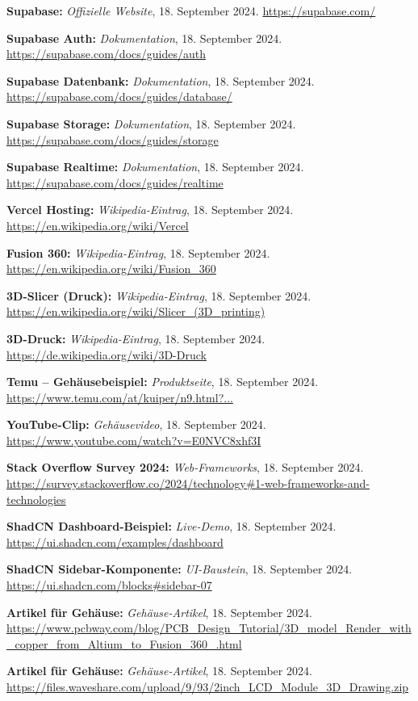 \begin{thebibliography}{9999}
\textbf{Supabase:} \textit{Offizielle Website}, 18. September 2024.  
\url{https://supabase.com/}

\textbf{Supabase Auth:} \textit{Dokumentation}, 18. September 2024.  
\url{https://supabase.com/docs/guides/auth}

\textbf{Supabase Datenbank:} \textit{Dokumentation}, 18. September 2024.  
\url{https://supabase.com/docs/guides/database/}

\textbf{Supabase Storage:} \textit{Dokumentation}, 18. September 2024.  
\url{https://supabase.com/docs/guides/storage}

\textbf{Supabase Realtime:} \textit{Dokumentation}, 18. September 2024.  
\url{https://supabase.com/docs/guides/realtime}

\textbf{Vercel Hosting:} \textit{Wikipedia-Eintrag}, 18. September 2024.  
\url{https://en.wikipedia.org/wiki/Vercel}

\textbf{Fusion 360:} \textit{Wikipedia-Eintrag}, 18. September 2024.  
\url{https://en.wikipedia.org/wiki/Fusion_360}

\textbf{3D-Slicer (Druck):} \textit{Wikipedia-Eintrag}, 18. September 2024.  
\url{https://en.wikipedia.org/wiki/Slicer_(3D_printing)}

\textbf{3D-Druck:} \textit{Wikipedia-Eintrag}, 18. September 2024.  
\url{https://de.wikipedia.org/wiki/3D-Druck}

\textbf{Temu – Gehäusebeispiel:} \textit{Produktseite}, 18. September 2024.  
\url{https://www.temu.com/at/kuiper/n9.html?...}

\textbf{YouTube-Clip:} \textit{Gehäusevideo}, 18. September 2024.  
\url{https://www.youtube.com/watch?v=E0NVC8xhf3I}

\textbf{Stack Overflow Survey 2024:} \textit{Web-Frameworks}, 18. September 2024.  
\url{https://survey.stackoverflow.co/2024/technology#1-web-frameworks-and-technologies}

\textbf{ShadCN Dashboard-Beispiel:} \textit{Live-Demo}, 18. September 2024.  
\url{https://ui.shadcn.com/examples/dashboard}

\textbf{ShadCN Sidebar-Komponente:} \textit{UI-Baustein}, 18. September 2024.  
\url{https://ui.shadcn.com/blocks#sidebar-07}

\textbf{Artikel für Gehäuse:} \textit{Gehäuse-Artikel}, 18. September 2024.  
\url{https://www.pcbway.com/blog/PCB_Design_Tutorial/3D_model_Render_with_copper_from_Altium_to_Fusion_360_.html}

\textbf{Artikel für Gehäuse:} \textit{Gehäuse-Artikel}, 18. September 2024.  
\url{https://files.waveshare.com/upload/9/93/2inch_LCD_Module_3D_Drawing.zip}

\end{thebibliography}
